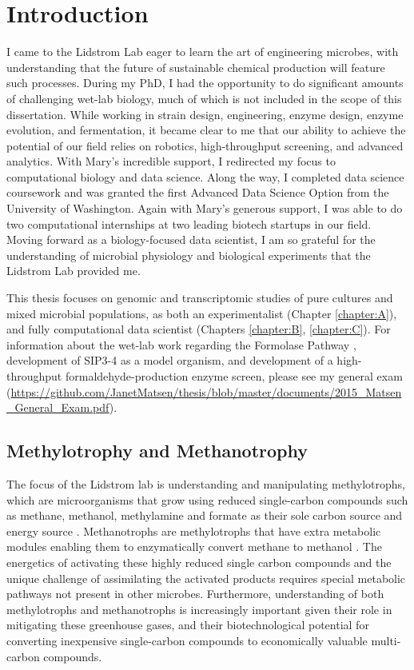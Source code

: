 \chapter{Introduction}

I came to the Lidstrom Lab eager to learn the art of engineering microbes, with understanding that the future of sustainable chemical production will feature such processes.
During my PhD, I had the opportunity to do significant amounts of challenging wet-lab biology, much of which is not included in the scope of this dissertation.
While working in strain design, engineering, enzyme design, enzyme evolution, and fermentation, it became clear to me that our ability to achieve the potential of our field relies on robotics, high-throughput screening, and advanced analytics.
With Mary's incredible support, I redirected my focus to computational biology and data science.
Along the way, I completed data science coursework and was granted the first Advanced Data Science Option from the University of Washington.
Again with Mary's generous support, I was able to do two computational internships at two leading biotech startups in our field.
Moving forward as a biology-focused data scientist, I am so grateful for the understanding of microbial physiology and biological experiments that the Lidstrom Lab provided me.

This thesis focuses on genomic and transcriptomic studies of pure cultures and mixed microbial populations, as both an experimentalist (Chapter \ref{chapter:A}), and fully computational data scientist (Chapters \ref{chapter:B}, \ref{chapter:C}).
For information about the wet-lab work regarding the Formolase Pathway \cite{siegel2015}, development of SIP3-4 as a model organism, and development of a high-throughput formaldehyde-production enzyme screen, please see my general exam (\url{https://github.com/JanetMatsen/thesis/blob/master/documents/2015_Matsen_General_Exam.pdf}).

\section{Methylotrophy and Methanotrophy}
The focus of the Lidstrom lab is understanding and manipulating methylotrophs, which are microorganisms that grow using reduced single-carbon compounds such as methane, methanol, methylamine and formate as their sole carbon source and energy source \cite{anthony1982,mila2009}.
Methanotrophs are methylotrophs that have extra metabolic modules enabling them to enzymatically convert methane to methanol \cite{kalyuzhnaya2015puri}.
The energetics of activating these highly reduced single carbon compounds and the unique challenge of assimilating the activated products requires special metabolic pathways not present in other microbes.
Furthermore, understanding of both methylotrophs and methanotrophs is increasingly important given their role in mitigating these greenhouse gases, and their biotechnological potential for converting inexpensive single-carbon compounds to economically valuable multi-carbon compounds.

